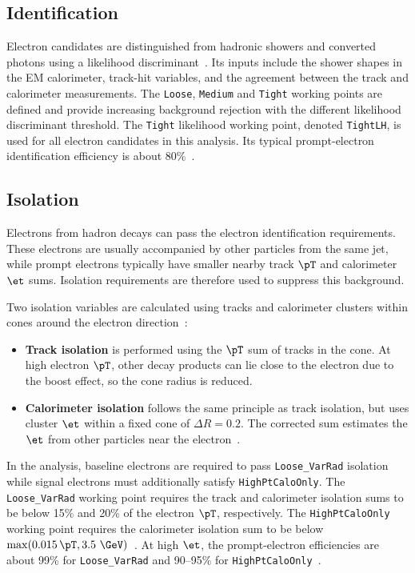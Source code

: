 \subsection{Identification}

Electron candidates are distinguished from hadronic showers and converted photons using a likelihood discriminant~\cite{ATLAS2019ElectronReco}.
Its inputs include the shower shapes in the EM calorimeter, track-hit variables, and the agreement between the track and calorimeter measurements.
The \texttt{Loose}, \texttt{Medium} and \texttt{Tight} working points are defined and provide increasing background rejection with the different likelihood discriminant threshold.
The \texttt{Tight} likelihood working point, denoted \texttt{TightLH}, is used for all electron candidates in this analysis.
Its typical prompt-electron identification efficiency is about 80\%~\cite{ATLAS2024ElectronPhotonEfficiencies}.

\subsection{Isolation}

Electrons from hadron decays can pass the electron identification requirements.
These electrons are usually accompanied by other particles from the same jet, while prompt electrons typically have smaller nearby track $\pT$ and calorimeter $\et$ sums.
Isolation requirements are therefore used to suppress this background.

Two isolation variables are calculated using tracks and calorimeter clusters within cones around the electron direction~\cite{ATLAS2019ElectronPerformance}:
\begin{itemize}
    \item \textbf{Track isolation} is performed using the $\pT$ sum of tracks in the cone. At high electron $\pT$, other decay products can lie close to the electron due to the boost effect, so the cone radius is reduced.
    \item \textbf{Calorimeter isolation} follows the same principle as track isolation, but uses cluster $\et$ within a fixed cone of $\Delta R=0.2$. The corrected sum estimates the $\et$ from other particles near the electron~\cite{ATLAS2019ElectronPerformance}.
\end{itemize}
In the analysis, baseline electrons are required to pass \texttt{Loose\_VarRad} isolation while signal electrons must additionally satisfy \texttt{HighPtCaloOnly}.
The \texttt{Loose\_VarRad} working point requires the track and calorimeter isolation sums to be below 15\% and 20\% of the electron $\pT$, respectively.
The \texttt{HighPtCaloOnly} working point requires the calorimeter isolation sum to be below $\max(0.015\,\pT,3.5~\GeV)$~\cite{ATLAS2019ElectronPerformance}.
At high $\et$, the prompt-electron efficiencies are about 99\% for \texttt{Loose\_VarRad} and 90--95\% for \texttt{HighPtCaloOnly}~\cite{ATLAS2024ElectronPhotonEfficiencies}.

